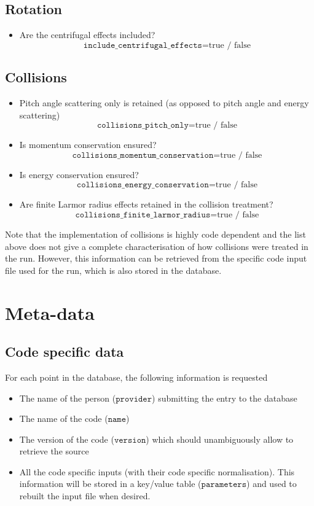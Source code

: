 \documentclass[a4paper]{report}
\begin{document}
\subsection{Rotation} \label{sec:rotswitches}
\begin{itemize}
	\item Are the centrifugal effects included?  
	$$\texttt{include\_centrifugal\_effects}= \textrm{true / false}$$ 
\end{itemize}
\subsection{Collisions} \label{sec:colswitches}
\begin{itemize}
	\item Pitch angle scattering only is retained (as opposed to pitch angle and energy scattering)
	$$\texttt{collisions\_pitch\_only}= \textrm{true / false}$$ 
	\item Is momentum conservation ensured?
	$$\texttt{collisions\_momentum\_conservation}= \textrm{true / false}$$ 
	\item Is energy conservation ensured?
	$$\texttt{collisions\_energy\_conservation}= \textrm{true / false}$$ 
	\item Are finite Larmor radius effects retained in the collision treatment?
	$$\texttt{collisions\_finite\_larmor\_radius}= \textrm{true / false}$$ 
\end{itemize}
Note that the implementation of collisions is highly code dependent and the list above does not give a complete characterisation of how collisions were treated in the run. However, this information can be retrieved from the specific code input file used for the run, which is also stored in the database.\\



\section{Meta-data}

\subsection{Code specific data} \label{sec:codespecfic}
For each point in the database, the following information is requested
\begin{itemize}
 \item The name of the person ($\texttt{provider}$) submitting the entry to the database
 \item The name of the code ($\texttt{name}$)
 \item The version of the code ($\texttt{version}$) which should unambiguously allow to retrieve the source 
 \item All the code specific inputs (with their code specific normalisation). This information will be stored in a key/value table ($\texttt{parameters}$) and used to rebuilt the input file when desired.
\end{itemize}
\end{document}
